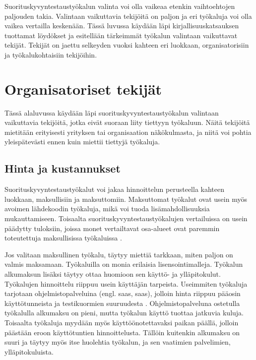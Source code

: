Suorituskyvyntestaustyökalun valinta voi olla vaikeaa etenkin vaihtoehtojen paljouden takia. Valintaan vaikuttavia tekijöitä on paljon ja eri työkaluja voi olla vaikea vertailla keskenään. Tässä luvussa käydään läpi kirjallisuuskatsauksen tuottamat löydökset ja esitellään tärkeimmät työkalun valintaan vaikuttavat tekijät. Tekijät on jaettu selkeyden vuoksi kahteen eri luokkaan, organisatorisiin ja työkalukohtaisiin tekijöihin.


\section{Organisatoriset tekijät}
\label{sec:organisatorisettekijät}
Tässä alaluvussa käydään läpi suorituskyvyntestaustyökalun valintaan vaikuttavia tekijöitä, jotka eivät suoraan liity tiettyyn työkaluun. Näitä tekijöitä mietitään erityisesti yrityksen tai organisaation näkökulmasta, ja niitä voi pohtia yleispätevästi ennen kuin miettii tiettyjä työkaluja.

\subsection{Hinta ja kustannukset}
\label{ssec:hinta}
Suorituskyvyntestaustyökalut voi jakaa hinnoittelun perusteella kahteen luokkaan, maksullisiin ja maksuttomiin. Maksuttomat työkalut ovat usein myös avoimen lähdekoodin työkaluja, mikä voi tuoda lisämahdollisuuksia mukauttamiseen. Toisaalta suorituskyvyntestaustyökalujen vertailuissa on usein päädytty tuloksiin, joissa monet vertailtavat osa-alueet ovat paremmin toteutettuja maksullisissa työkaluissa \parencite{WebPerformanceTestingTools, ComparativeAnalysisOfWeb}.

Jos valitaan maksullinen työkalu, täytyy miettiä tarkkaan, miten paljon on valmis maksamaan. Työkaluilla on monia erilaisia lisensointimalleja. Työkalun alkumaksun lisäksi täytyy ottaa huomioon sen käyttö- ja ylläpitokulut. Työkalujen hinnoittelu riippuu usein käyttäjän tarpeista. Useimmiten työkaluja tarjotaan ohjelmistopalveluina (engl. \acrlong{saas}, \acrshort{saas}), jolloin hinta riippuu pääosin käyttötunneista ja testikuormien suuruudesta \parencite{WebLOAD, LoadNinja}. Ohjelmistopalveluna ostetulla työkalulla alkumaksu on pieni, mutta työkalun käyttö tuottaa jatkuvia kuluja. Toisaalta työkaluja myydään myös käyttöönotettavaksi paikan päällä, jolloin päästään eroon käyttötuntien hinnoittelusta. Tällöin kuitenkin alkumaksu on suuri ja täytyy myös itse huolehtia työkalun, ja sen vaatimien palvelimien, ylläpitokuluista. \parencite{Gatling} 


